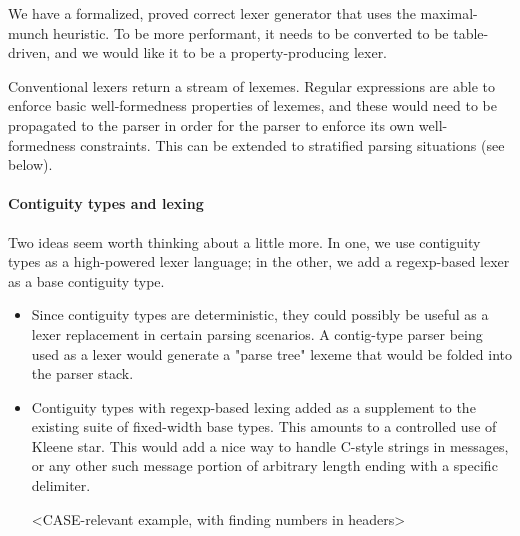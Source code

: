 \documentclass{article}
\begin{document}
   We have a formalized, proved correct lexer generator that uses the
   maximal-munch heuristic. To be more performant, it needs to be
   converted to be table-driven, and we would like it to be a
   property-producing lexer.

   Conventional lexers return a stream of lexemes. Regular expressions
   are able to enforce basic well-formedness properties of lexemes,
   and these would need to be propagated to the parser in order for
   the parser to enforce its own well-formedness constraints. This can
   be extended to stratified parsing situations (see below).


\paragraph{Contiguity types and lexing}

   Two ideas seem worth thinking about a little more. In one, we use
   contiguity types as a high-powered lexer language; in the other, we
   add a regexp-based lexer as a base contiguity type.

\begin{itemize}

\item Since contiguity types are deterministic, they could possibly be
      useful as a lexer replacement in certain parsing scenarios. A
      contig-type parser being used as a lexer would generate a "parse
      tree" lexeme that would be folded into the parser stack.

\item Contiguity types with regexp-based lexing added as a supplement
      to the existing suite of fixed-width base types. This amounts to
      a controlled use of Kleene star. This would add a nice way to
      handle C-style strings in messages, or any other such message
      portion of arbitrary length ending with a specific delimiter.

      <CASE-relevant example, with finding numbers in headers>
\end{itemize}

 
\end{document}
